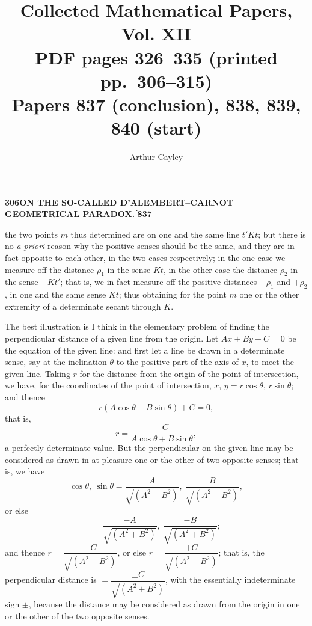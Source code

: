 \documentclass[11pt]{article}
\title{Collected Mathematical Papers, Vol. XII\\ \large PDF pages 326--335 (printed pp.\ 306--315)\\ Papers 837 (conclusion), 838, 839, 840 (start)}
\author{Arthur Cayley}
\date{}
\begin{document}
\maketitle


\noindent\textbf{306}\hfill\textbf{ON THE SO-CALLED D'ALEMBERT--CARNOT GEOMETRICAL PARADOX.}\hfill\textbf{[837}

\bigskip

\noindent the two points $m$ thus determined are on one and the same line $t'Kt$; but there is no \textit{a priori} reason why the positive senses should be the same, and they are in fact opposite to each other, in the two cases respectively; in the one case we measure off the distance $\rho_{1}$ in the sense $Kt$, in the other case the distance $\rho_{2}$ in the sense $+Kt'$; that is, we in fact measure off the positive distances $+\rho_{1}$ and $+\rho_{2}$, in one and the same sense $Kt$; thus obtaining for the point $m$ one or the other extremity of a determinate secant through $K$.

\medskip

The best illustration is I think in the elementary problem of finding the perpendicular distance of a given line from the origin. Let $Ax + By + C = 0$ be the equation of the given line: and first let a line be drawn in a determinate sense, say at the inclination $\theta$ to the positive part of the axis of $x$, to meet the given line. Taking $r$ for the distance from the origin of the point of intersection, we have, for the coordinates of the point of intersection, $x$, $y = r\cos\theta$, $r\sin\theta$; and thence
\[
r(A\cos\theta + B\sin\theta) + C = 0,
\]
that is,
\[
r = \frac{-C}{A\cos\theta + B\sin\theta},
\]
a perfectly determinate value. But the perpendicular on the given line may be considered as drawn in at pleasure one or the other of two opposite senses; that is, we have
\[
\cos\theta,\ \sin\theta = \frac{A}{\sqrt{(A^{2}+B^{2})}},\ \frac{B}{\sqrt{(A^{2}+B^{2})}},
\]
or else
\[
= \frac{-A}{\sqrt{(A^{2}+B^{2})}},\ \frac{-B}{\sqrt{(A^{2}+B^{2})}};
\]
and thence $r = \dfrac{-C}{\sqrt{(A^{2}+B^{2})}}$, or else $r = \dfrac{+C}{\sqrt{(A^{2}+B^{2})}}$; that is, the perpendicular distance is $= \dfrac{\pm C}{\sqrt{(A^{2}+B^{2})}}$, with the essentially indeterminate sign $\pm$, because the distance may be considered as drawn from the origin in one or the other of the two opposite senses.
\end{document}
